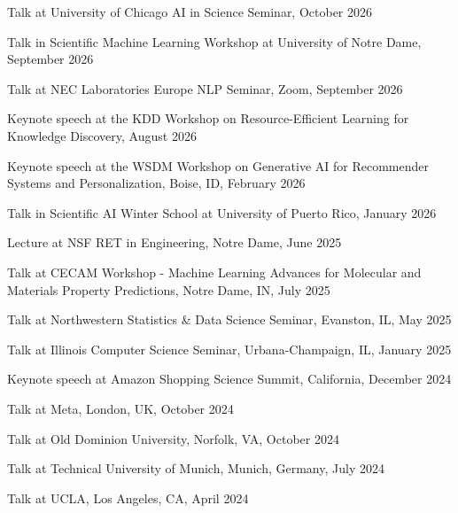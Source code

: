 \documentclass[10pt]{article}
\newenvironment{myindentpar}[1]%
{\begin{list}{}%
         {\setlength{\leftmargin}{#1}}%
         \item[]%
}
{\end{list}}
\newcounter{list}
\begin{document}
\begin{myindentpar}{0.75cm}

\hspace{-0.75cm} Talk at University of Chicago AI in Science Seminar, October 2026
	
\hspace{-0.75cm} Talk in Scientific Machine Learning Workshop at University of Notre Dame, September 2026

\hspace{-0.75cm} Talk at NEC Laboratories Europe NLP Seminar, Zoom, September 2026

\hspace{-0.75cm} Keynote speech at the KDD Workshop on Resource-Efficient Learning for Knowledge Discovery, August 2026

\hspace{-0.75cm} Keynote speech at the WSDM Workshop on Generative AI for Recommender Systems and Personalization, Boise, ID, February 2026

\hspace{-0.75cm} Talk in Scientific AI Winter School at University of Puerto Rico, January 2026
	
\hspace{-0.75cm} Lecture at NSF RET in Engineering, Notre Dame, June 2025
	
\hspace{-0.75cm} Talk at CECAM Workshop - Machine Learning Advances for Molecular and Materials Property Predictions, Notre Dame, IN, July 2025

\hspace{-0.75cm} Talk at Northwestern Statistics \& Data Science Seminar, Evanston, IL, May 2025
	
\hspace{-0.75cm} Talk at Illinois Computer Science Seminar, Urbana-Champaign, IL, January 2025

\hspace{-0.75cm} Keynote speech at Amazon Shopping Science Summit, California, December 2024	

\hspace{-0.75cm} Talk at Meta, London, UK, October 2024
	
\hspace{-0.75cm} Talk at Old Dominion University, Norfolk, VA, October 2024
	
\hspace{-0.75cm} Talk at Technical University of Munich, Munich, Germany, July 2024
	
\hspace{-0.75cm} Talk at UCLA, Los Angeles, CA, April 2024
	

\end{myindentpar}
\end{document}
